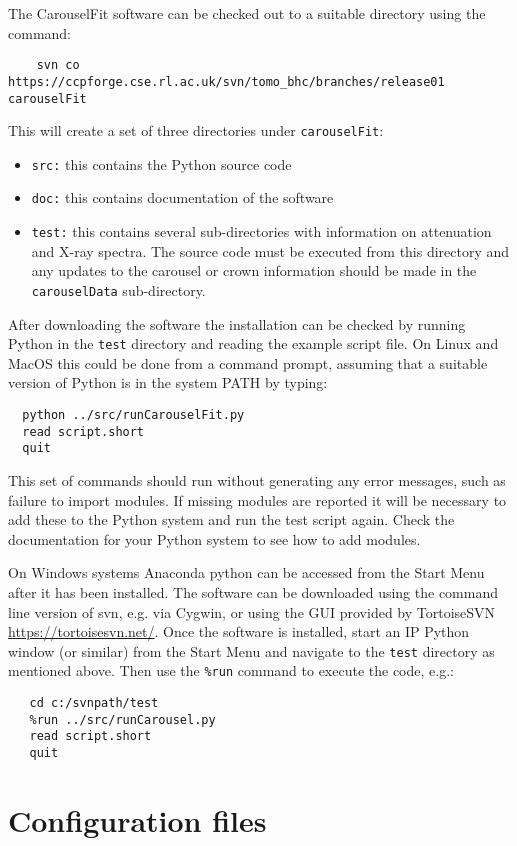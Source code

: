 \documentclass[a4paper,12pt]{article}
\begin{document}
The CarouselFit software can be checked out to a suitable directory using the command:
\begin{verbatim}
    svn co https://ccpforge.cse.rl.ac.uk/svn/tomo_bhc/branches/release01 carouselFit
\end{verbatim}
This will create a set of three directories under \texttt{carouselFit}:
\begin{itemize}
\item \texttt{src:} this contains the Python source code
\item \texttt{doc:} this contains documentation of the software
\item \texttt{test:} this contains several sub-directories with information on attenuation and X-ray spectra.
The source code must be executed from this directory and any updates to the carousel or crown information
should be made in the \texttt{carouselData} sub-directory.
\end{itemize}

After downloading the software the installation can be checked by running Python in the \texttt{test} directory
and reading the example script file.
On Linux and MacOS this could be done from a command prompt, assuming that a suitable version of Python is in the system PATH by typing:
\begin{verbatim}
  python ../src/runCarouselFit.py
  read script.short
  quit
\end{verbatim}

This set of commands should run without generating any error messages, such as failure to import modules.
If missing modules are reported it will be necessary to add these to the Python system and run the test script again.
Check the documentation for your Python system to see how to add modules.

On Windows systems Anaconda python can be accessed from the Start Menu after it has been installed.
The software can be downloaded using the command line version of svn, e.g. via Cygwin, or using the GUI
provided by TortoiseSVN \url{https://tortoisesvn.net/}.
Once the software is installed, start an IP Python window (or similar) from the Start Menu and navigate to the 
\texttt{test} directory as mentioned above. Then use the \texttt{\%run} command to execute the code, e.g.:
\begin{verbatim}
   cd c:/svnpath/test
   %run ../src/runCarousel.py
   read script.short
   quit
\end{verbatim}

\section{Configuration files}
\end{document}
